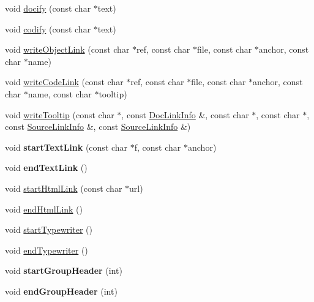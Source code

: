 \begin{DoxyCompactItemize}
\item 
void \hyperlink{class_r_t_f_generator_ab9d90b3c6f2e1105a2fe6ce2a1486f75}{docify} (const char $\ast$text)
\item 
void \hyperlink{class_r_t_f_generator_a96b26b0cb63719fd5370a9a04d2ebb38}{codify} (const char $\ast$text)
\item 
void \hyperlink{class_r_t_f_generator_a78d7e4718290246f77043de949c83081}{write\-Object\-Link} (const char $\ast$ref, const char $\ast$file, const char $\ast$anchor, const char $\ast$name)
\item 
void \hyperlink{class_r_t_f_generator_ab3866da052a840c400b4990dd2ddf61b}{write\-Code\-Link} (const char $\ast$ref, const char $\ast$file, const char $\ast$anchor, const char $\ast$name, const char $\ast$tooltip)
\item 
void \hyperlink{class_r_t_f_generator_a7ff5de02f14ba4c6b98edcaa3483e386}{write\-Tooltip} (const char $\ast$, const \hyperlink{struct_doc_link_info}{Doc\-Link\-Info} \&, const char $\ast$, const char $\ast$, const \hyperlink{struct_source_link_info}{Source\-Link\-Info} \&, const \hyperlink{struct_source_link_info}{Source\-Link\-Info} \&)
\item 
\hypertarget{class_r_t_f_generator_aa3b06c8a4110ceaf651ff08aaceadc5b}{void {\bfseries start\-Text\-Link} (const char $\ast$f, const char $\ast$anchor)}\label{class_r_t_f_generator_aa3b06c8a4110ceaf651ff08aaceadc5b}

\item 
\hypertarget{class_r_t_f_generator_a98515ca43c32f8bc616925eb3c683b6e}{void {\bfseries end\-Text\-Link} ()}\label{class_r_t_f_generator_a98515ca43c32f8bc616925eb3c683b6e}

\item 
void \hyperlink{class_r_t_f_generator_a0746b9c06743e1d4fe527b8317457da1}{start\-Html\-Link} (const char $\ast$url)
\item 
void \hyperlink{class_r_t_f_generator_ac2ba450d319270e186e436167c8609ce}{end\-Html\-Link} ()
\item 
void \hyperlink{class_r_t_f_generator_a2e60bda5e249554e2fc264aa32d9d93e}{start\-Typewriter} ()
\item 
void \hyperlink{class_r_t_f_generator_acb220673316232acd7d1050553dafaf6}{end\-Typewriter} ()
\item 
\hypertarget{class_r_t_f_generator_ac9eee86f35f465f0160ccea844c3b80d}{void {\bfseries start\-Group\-Header} (int)}\label{class_r_t_f_generator_ac9eee86f35f465f0160ccea844c3b80d}

\item 
\hypertarget{class_r_t_f_generator_ae267a69e7fa49c697d1cdce247d81b38}{void {\bfseries end\-Group\-Header} (int)}\label{class_r_t_f_generator_ae267a69e7fa49c697d1cdce247d81b38}


\end{DoxyCompactItemize}
